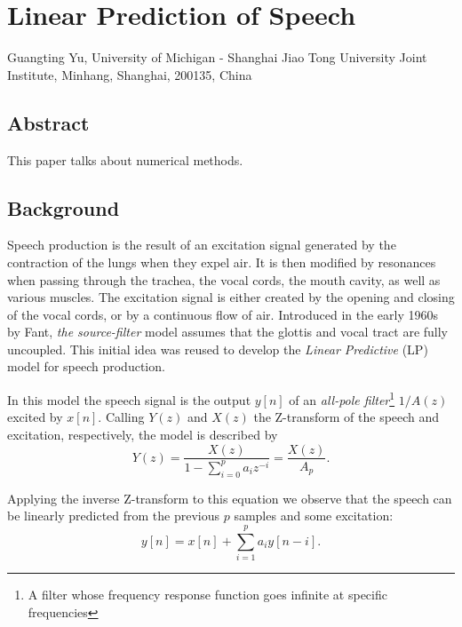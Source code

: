 \titleformat{\section}{\normalfont\large\bfseries}{\thesection}{1em}{}
\renewcommand{\chaptername}{Project}
\renewcommand{\thesection}{\arabic{section}}


\chapter{Linear Prediction of Speech}
\begin{center}
Guangting Yu, University of Michigan - Shanghai Jiao Tong University Joint Institute, Minhang, Shanghai, 200135, China
\end{center}


\section*{Abstract}
This paper talks about numerical methods.


\section{Background}
Speech production is the result of an excitation signal generated by the contraction of the lungs when they expel air.\cite{dutoit}
It is then modified by resonances when passing through the trachea, the vocal cords, the mouth cavity, as well as various muscles.\cite{tam59}
The excitation signal is either created by the opening and closing of the vocal cords, or by a continuous flow of air.\cite{gtm181}
Introduced in the early 1960s by Fant, \textit{the source-filter} model assumes that the glottis and vocal tract are fully uncoupled.\cite{corless}
This initial idea was reused to develop the \textit{Linear Predictive} (LP) model for speech production.\cite{tam39}

In this model the speech signal is the output \(y[n]\) of an \textit{all-pole filter}\footnote{A filter whose frequency response function goes infinite at specific frequencies} \(1/A(z)\) excited by \(x[n]\).\cite{golan}
Calling \(Y(z)\) and \(X(z)\) the Z-transform of the speech and excitation, respectively, the model is described by\cite{utm}
\begin{equation}
Y(z)=\frac{X(z)}{1-\sum_{i=0}^p a_i z^{-i}}=\frac{X(z)}{A_p}.
\end{equation}

Applying the inverse Z-transform to this equation we observe that the speech can be linearly predicted from the previous $p$ samples and some excitation:
\begin{equation}\label{model}
y[n] = x[n]+\sum_{i=1}^p a_i y[n-i].
\end{equation}

